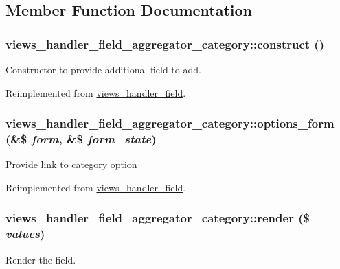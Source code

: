\subsection{Member Function Documentation}
\hypertarget{classviews__handler__field__aggregator__category_ad85fc06aa0e07281e3989dee8bd0c975}{
\subsubsection[{construct}]{\setlength{\rightskip}{0pt plus 5cm}views\_\-handler\_\-field\_\-aggregator\_\-category::construct ()}}
\label{classviews__handler__field__aggregator__category_ad85fc06aa0e07281e3989dee8bd0c975}
Constructor to provide additional field to add. 

Reimplemented from \hyperlink{classviews__handler__field_a3d50050864c255b71c842972a45d39f6}{views\_\-handler\_\-field}.\hypertarget{classviews__handler__field__aggregator__category_a43be8cbc1313b8b3f51321490d40a914}{
\subsubsection[{options\_\-form}]{\setlength{\rightskip}{0pt plus 5cm}views\_\-handler\_\-field\_\-aggregator\_\-category::options\_\-form (\&\$ {\em form}, \/  \&\$ {\em form\_\-state})}}
\label{classviews__handler__field__aggregator__category_a43be8cbc1313b8b3f51321490d40a914}
Provide link to category option 

Reimplemented from \hyperlink{classviews__handler__field_a0435d161922b7b4b84f02a2e79bb947a}{views\_\-handler\_\-field}.\hypertarget{classviews__handler__field__aggregator__category_a7e4b0ebcef6f6f5b37480eb15eb378f0}{
\subsubsection[{render}]{\setlength{\rightskip}{0pt plus 5cm}views\_\-handler\_\-field\_\-aggregator\_\-category::render (\$ {\em values})}}
\label{classviews__handler__field__aggregator__category_a7e4b0ebcef6f6f5b37480eb15eb378f0}
Render the field.


